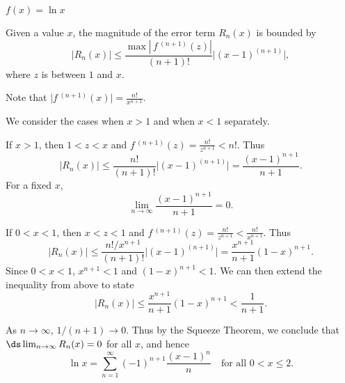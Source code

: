 {$f(x) = \ln x$
}
{Given a value $x$, the magnitude of the error term $R_n(x)$ is bounded by
$$ \big|R_n(x)\big| \leq \frac{\max\left|\,f\,^{(n+1)}(z)\right|}{(n+1)!}\big|(x-1)^{(n+1)}\big|,$$
where $z$ is between $1$ and $x$. 

Note that $\big|f\,^{(n+1)}(x)\big| = \frac{n!}{x^{n+1}}$. 

We consider the cases when $x>1$ and when $x<1$ separately.

If $x>1$, then $1<z<x$ and $f\,^{(n+1)}(z) =\frac{n!}{z^{n+1}}<n!$. Thus
$$ \big|R_n(x)\big| \leq \frac{n!}{(n+1)!}\big|(x-1)^{(n+1)}\big|= \frac{(x-1)^{n+1}}{n+1}.$$
For a fixed $x$,
$$\lim_{n\to\infty} \frac{(x-1)^{n+1}}{n+1}=0.$$


If $0<x<1$, then $x<z<1$ and $f\,^{(n+1)}(z) =\frac{n!}{z^{n+1}}<\frac{n!}{x^{n+1}}$. Thus
$$ \big|R_n(x)\big| \leq \frac{n!/x^{n+1}}{(n+1)!}\big|(x-1)^{(n+1)}\big| = \frac{x^{n+1}}{n+1}(1-x)^{n+1}.$$
Since $0<x<1$, $x^{n+1}<1$ and $(1-x)^{n+1}<1$. We can then extend the inequality from above to state
$$\big|R_n(x)\big| \leq \frac{x^{n+1}}{n+1}(1-x)^{n+1}<\frac1{n+1}.$$

As $n\to\infty$, $1/(n+1)\to0$. Thus by the Squeeze Theorem, we conclude that $\ds \lim_{n\to\infty} R_n(x) = 0$ for all $x$, and hence
$$\ln x = \sum_{n=1}^\infty (-1)^{n+1}\frac{(x-1)^{n}}{n}\quad \text{for all $0<x\leq 2$}.$$
}